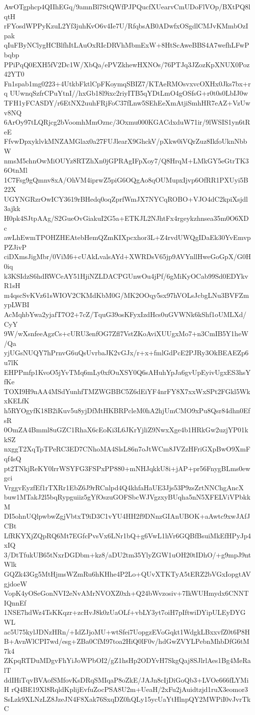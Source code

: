 AwOTgphcp4QIIhEGq/9amnBl7StQWfPJPQucfXUearvCmUDoFlVOp/BXtPQ8lqtH
rFYosdWPPyKzuL2Yf3juhKvO6v4Ie7U/RfqbsAB0ADwfxOSgdlCMJvKMmbOzIpak
qIuFByNClygHCBlfhItLAuOxRIcDRVhMbmExW+8HtScAweBBS4A7wefhLFwPbqbp
PPiPqQ0EXH5fV2Dc1W/XbQa/ePVZkhewHXNOs/76PTJq3JZozKpXNUX0Poz42YT0
Fn1spab1mg0223+4UtkbFktlCpFKoymqSBIZ7/KTAeRMOsvxvcOXHx0Jks7bx+rq
UUwnqSzfrCPuYtnI//hxGb18l9ixc2riyITB5qYDtLmO4gOSfsG+r0t0s0LbIJ0w
TFH1yFCASDY/r6EtNX2uuhFRjFoC37fLnw5SEhEeXmAtjiSmhHR7eAZ+VzUwv8NQ
6ArOy97tLQRjcg2bVoomhMmOznc/3Oxmu000KGACdxduW71ir/9lWSIS1yn6tReE
FfvwDpxyklvkMNZAMGlax0a27FUJlearX9GhckV/pXkw0iVQrZuz8IkfoUknNbbW
nmsM5chnOwMiOUYz8RTZhXn0jGPRAgIFpXoy7/Q8HrqM+LMkGY5eGtrTK36OtnMl
1C7Fsg9gQmnv8xA/OhVM4iprwZ5piG6OQgAo8qOUMupxIjvp6OfRR1PXUyi5B22X
UGYNGRzrOwICY3619rBHedq0oqZprfWmJX7NYCqROBO+VJO4dC2kpiXsjdl3ajkk
H0pk4SJtpAAg/S2GueOvGiakuI2G5a+ETKJL2NJhtFx4rgeykzhnsea35m0O6XDc
awLhEwmTPOHZHEAtebHemQZmKIXpcxhor3L+Z4rvdUWQgIDaEk30YvEmvpPZJivP
ciDXmsJigMbr/0ViM6+cUAkLvalsAYd+XWRDsV65jp9AVYnllHweGoGpX/G0H0iq
k3KSIdzS6hdRWCeAY51HjiNZLDACPGUnwOu4jPf/6gMiKyOCab99Sd0EDYkvR1sH
m4qscSvKVz61sWIOV2CKMdKbM0G/MK2OOqy5sx97hVOLsJcbgLNu3BVFZmypLWBI
AcMqhbYwa2yjafT7O2+7cZ/TquG39osKFyxIzdHcs0uGVWNk6kShf1oUMLXd/CyY
9W/wXsnfeeAgzCs+cURU3enfOG7Zfl7VstZKoAviXUUgxMo7+n3CmIB5Y1heW/Qa
yjUGsNUQY7hPrnvG6uQsUvrbaJK2vGJx/r+x+fmlGdPcE2PJRy3OkBEAEZp6u7lK
EHPPmfp1KvoO5jYvTMq6mLy0xfOuXSY0Q6sAHuhYpJa6gvUpEyivUgxES3hsYfKe
TOXI9H9nAA4MSdYunhfTMZWGBBC5Z6dEiYF4nrFY8X7xxWxSPt2FGkl5WkxKELfK
h5RYOgyfK18B2iKuv5u8yjDfMtHKBRPcleM0hA2hjUmCMO9xPu8Qsr84dhn0EfsR
0OmZA4Bmml8uGZC1RhaX6cEoKi3L6JKrYjliZ9NwxXge4b1HRkGw2uzjYP01kkSZ
nxggT2XqTpTPeRC3ED7CNhoMA4SlsL86n7oJtWCm8JVZzHFriGXpBwO9XmFqf4sQ
pt2TNkjReKY0lrrWSYFG3FSPxPP880+mNHJqkkU8i+jAP+pr56FnygBLms0ewgci
VrggvEyzfEf1rTXRr1EbZ6J9rRCnlpd4Q4khfaHaUE3Jjs53P9zsZrtNNChgAncX
buw1MTakJ2l5bqRypguiiz5gYfOszuGOFSbcWJVgzxyBUqha5nN5XFELViVPbkkM
DI5ohnUQlpwbwZgjVbtxT9iD3C1vYU4HH2f9DNnzGIAnUBOK+aAwtc9xwJAfJCBt
LfRKYXjZQpRQ6Mt7EGfcPvsVx6LNr1bQ+g6VwL1hVr6GQBfBsuiMkEfHPyJp4xIQ
3/DtTfukUB65tNxrDGDbm+kz8/aDU2tm35YlyZGW1uOH20tIDhO/+g9mpJ9ntWlk
GQZk43Gg5MtHjmsWZmRu6hKHhe4P2Lo+QUvXTKTyA5tERZ2bVGxIopgtAVgjdoeW
VopK4yOSeGonNVI2eNvAMrNVOXZ0xh+Q24bWvzosiv+7IkWUHmydx6CNNTIQnnEf
1NSE7hdWz4TsKKqzr+zcHvJ8k0zUaOLf+vbLY3yt7oiH7pIftwiDYipULEyDYGWL
ac5U75kylJDNzHRn/+IdZJjoMU+wtSfei7UopgzEVoGqkt1WdgkLBxxvfZ0t6P8H
B+AvnWlCPI7wd/esg+ZBa0CfM97toa2HiQ0lF0v/hdGwZVYLPebnMhbDfG6tM7k4
ZKpqRTDuMDgvFhYiJoWPbOI2/gZ1hsHp2ODYvH7SkgQaj8SJlrlAes1Bg4MeRalT
ddIHiTqvBVAofSMfovKsDRqSMIqaP8oZkE/JAJn8cIjDiGoQb3+LVOe666fLYMiH
rQ4BE19Xl8RqldKplijEvfuZocPSA8U2m+UeaH/2xFu2jAuidtzjd1ruX3eomor3
SsLzk9XLNzLZ8JzeJN4F8Xak76SxqDZ0hQLy15ycUaYtHlnpQY2MWPiI0vJvrTkC
